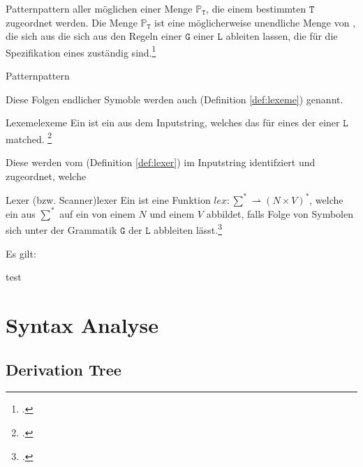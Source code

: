 \begin{Definition}{Pattern}{pattern}
   aller möglichen  einer Menge $\mathbb{P}_\mathtt{T}$, die einem bestimmten  $\mathtt{T}$ zugeordnet werden.
  Die Menge $\mathbb{P}_\mathtt{T}$ ist eine möglicherweise unendliche Menge von , die sich aus die sich aus den Regeln einer  $\mathtt{G}$ einer  $\mathtt{L}$ ableiten lassen, die für die Spezifikation eines   zuständig sind.\footcite{noauthor_what_nodate}
\end{Definition}{Pattern}{pattern}

Diese Folgen endlicher Symoble werden auch  (Definition \ref{def:lexeme}) genannt.

\begin{Definition}{Lexeme}{lexeme}
  Ein  ist ein  aus dem Inputstring, welches das  für eines der  einer  $\mathtt{L}$ matched.
\footcite{noauthor_what_nodate}
\end{Definition}

Diese  werden vom  (Definition \ref{def:lexer}) im Inputstring identifziert und  zugeordnet, welche

\begin{Definition}{Lexer (bzw. Scanner)}{lexer}
  Ein  ist eine  Funktion \hspace{0.2cm}$lex: \sum^{*} \rightharpoonup (N \times V)^{*}$, welche ein  aus $\sum^{*}$ auf ein  von einem  $N$ und einem   $V$ abbildet, falls Folge von Symbolen sich unter der Grammatik $\mathtt{G}$ der  $\mathtt{L}$ abbleiten lässt.\footcite{noauthor_lecture-notes-2021_2022}
\end{Definition}

Es gilt:

\begin{special_paragraph}
  test
\end{special_paragraph}

\section{Syntax Analyse}
\subsection{Derivation Tree}
